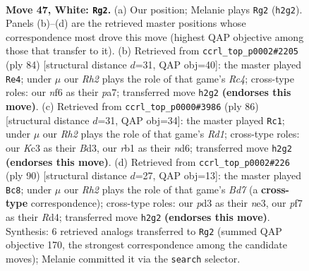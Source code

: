\documentclass[11pt]{article}
\begin{document}
\clearpage

\begin{figure}[p]\centering
\begin{subfigure}{0.46\textwidth}\centering
\resizebox{\linewidth}{!}{%
\newchessgame
\chessboard[
  setfen={7k/5p2/5n1B/8/p3p2p/P1Kp3P/1P3P1R/1r6 w - - 1 47},
  showmover=false,
  pgfstyle=straightmove, color=movearrow, markmove={h2-g2}
]}
\caption{}
\end{subfigure}\hfill
\begin{subfigure}{0.46\textwidth}\centering
\resizebox{\linewidth}{!}{%
\newchessgame
\chessboard[
  setfen={7k/p5p1/1p5p/1P5P/P1R3P1/r4pK1/8/8 w - - 2 43},
  showmover=false,
  pgfstyle=straightmove, color=movearrow, markmove={c4-e4}
]}
\caption{}
\end{subfigure}
\\[4pt]
\begin{subfigure}{0.46\textwidth}\centering
\resizebox{\linewidth}{!}{%
\newchessgame
\chessboard[
  setfen={4r1k1/8/1p1n1p2/pP1P1p1p/5K1P/3B2P1/1P6/3R4 w - - 0 44},
  showmover=false,
  pgfstyle=straightmove, color=movearrow, markmove={d1-c1}
]}
\caption{}
\end{subfigure}\hfill
\begin{subfigure}{0.46\textwidth}\centering
\resizebox{\linewidth}{!}{%
\newchessgame
\chessboard[
  setfen={5k2/3B1p1p/1p4p1/6P1/1P1R1P1P/1K2n3/5r2/8 w - - 6 46},
  showmover=false,
  pgfstyle=straightmove, color=movearrow, markmove={d7-c8}
]}
\caption{}
\end{subfigure}
\caption{\textbf{Move 47, White: \texttt{Rg2}.} (a) Our position; Melanie plays \texttt{Rg2} (\texttt{h2g2}). Panels (b)--(d) are the retrieved master positions whose correspondence most drove this move (highest QAP objective among those that transfer to it). (b) Retrieved from \texttt{ccrl\_top\_p0002\#2205} (ply 84) [structural distance $d$=31, QAP obj=40]: the master played \texttt{Re4}; under $\mu$ our \emph{Rh2} plays the role of that game's \emph{Rc4}; cross-type roles: our \emph{n}f6 as their \emph{p}a7; transferred move \texttt{h2g2} \textbf{(endorses this move)}. (c) Retrieved from \texttt{ccrl\_top\_p0000\#3986} (ply 86) [structural distance $d$=31, QAP obj=34]: the master played \texttt{Rc1}; under $\mu$ our \emph{Rh2} plays the role of that game's \emph{Rd1}; cross-type roles: our \emph{K}c3 as their \emph{B}d3, our \emph{r}b1 as their \emph{n}d6; transferred move \texttt{h2g2} \textbf{(endorses this move)}. (d) Retrieved from \texttt{ccrl\_top\_p0002\#226} (ply 90) [structural distance $d$=27, QAP obj=13]: the master played \texttt{Bc8}; under $\mu$ our \emph{Rh2} plays the role of that game's \emph{Bd7} (a \textbf{cross-type} correspondence); cross-type roles: our \emph{p}d3 as their \emph{n}e3, our \emph{p}f7 as their \emph{R}d4; transferred move \texttt{h2g2} \textbf{(endorses this move)}. Synthesis: 6 retrieved analogs transferred to \texttt{Rg2} (summed QAP objective 170, the strongest correspondence among the candidate moves); Melanie committed it via the \texttt{search} selector.}
\label{fig:thought-m92}
\end{figure}
\end{document}
